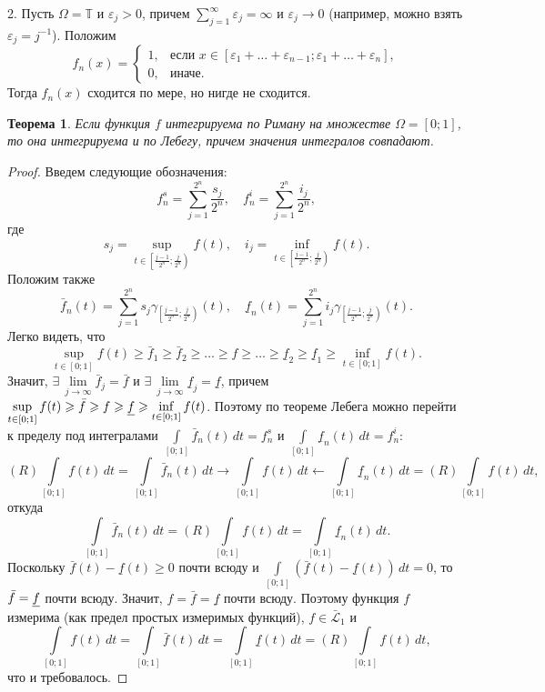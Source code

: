 \documentclass[12pt,titlepage]{article}
\newcounter{tema}
\newtheorem{theorem}{Теорема}[tema]
\theoremstyle{definition}
\newcommand*{\p}[1]{#1\nobreak\discretionary{}{\hbox{$\mathsurround=0pt #1$}}{}}
\begin{document}
2. Пусть $\Omega=\mathbb{T}$ и $\varepsilon_j>0$, причем
$\sum\limits_{j=1}^\infty \varepsilon_j=\infty$ и $\varepsilon_j\to
0$ (например, можно взять $\varepsilon_j=j^{-1}$). Положим
$$f_n(x)=\begin{cases}1,& \text{если $x\in[\varepsilon_1+\ldots+\varepsilon_
{n-1};\varepsilon_1+\ldots+\varepsilon_n]$},\\
0,&\text{иначе}.\end{cases}$$ Тогда $f_n(x)$ сходится по мере, но
нигде не сходится.

\vspace{5pt}

\begin{theorem}
Если функция $f$ интегрируема по Риману на множестве $\Omega=[0;1]$,
то она интегрируема и по Лебегу, причем значения интегралов
совпадают.
\end{theorem}

\begin{proof}
Введем следующие обозначения:
$$f_n^s=\sum\limits_{j=1}^{2^n}\frac{s_j}{2^n}, \quad
f_n^i=\sum\limits_{j=1}^{2^n}\frac{i_j}{2^n},$$ где
$$s_j=\sup\limits_{t\in\left[\frac{j-1}{2^n};\frac{j}{2^n}\right)}f(t), \quad
i_j=\inf\limits_{t\in\left[\frac{j-1}{2^n};\frac{j}{2^n}\right)}f(t).$$
Положим также
$$\bar{f}_n(t)=\sum\limits_{j=1}^{2^n}s_j\gamma_{\left[\frac{j-1}{2^n};
\frac{j}{2^n}\right)}(t), \quad
\underline{f}_n(t)=\sum\limits_{j=1}^{2^n}i_j\gamma_{\left[\frac{j-1}{2^n};
\frac{j}{2^n}\right)}(t).$$ Легко видеть, что
$$\sup\limits_{t\in[0;1]} f(t)\geqslant
\bar{f}_1\geqslant\bar{f}_2\geqslant\ldots\geqslant
f\geqslant\ldots\geqslant\underline{f}_2\geqslant\underline{f}_1\geqslant\inf
\limits_{t\in[0;1]}f(t).$$ Значит,
$\exists\,\lim\limits_{j\to\infty} \bar{f}_j=\bar{f}$ и
$\exists\,\lim\limits_{j\to\infty} \underline{f}_j=\underline{f}$,
причем $\sup\limits_{t\in[0;1]}f(t)\geqslant \bar{f}\geqslant
f\geqslant\underline{f}\p\geqslant \inf\limits_{t\in[0;1]}f(t)$.
Поэтому по теореме Лебега можно перейти к пределу под интегралами
$\int\limits_{[0;1]}\!\bar{f}_n(t)\,dt=f_n^s$ и
$\int\limits_{[0;1]}\!\underline{f}_n(t)\,dt=f_n^i$:
$$(R)\int\limits_{[0;1]}\!f(t)\,dt=\int\limits_{[0;1]}\!\bar{f}_n(t)\,dt\to
\int\limits_{[0;1]}\!f(t)\,dt\leftarrow\int\limits_{[0;1]}\!\underline{f}_n(t)\,dt
=(R)\int\limits_{[0;1]}\!f(t)\,dt,$$ откуда
$$\int\limits_{[0;1]}\!\bar{f}_n(t)\,dt=(R)\int\limits_{[0;1]}\!f(t)\,dt=
\int\limits_{[0;1]}\!\underline{f}_n(t)\,dt.$$ Поскольку
$\bar{f}(t)-\underline{f}(t)\geqslant 0$ почти всюду и
$\int\limits_{[0;1]}\!(\bar{f}(t)-\underline{f}(t))\,dt=0$, то
$\bar{f}\p=\underline{f}$ почти всюду. Значит,
$f=\bar{f}=\underline{f}$ почти всюду. Поэтому функция $f$ измерима
(как предел простых измеримых функций), $f\in\mathcal{\bar{L}}_1$ и
$$\int\limits_{[0;1]}\!f(t)\,dt=\int\limits_{[0;1]}\!\bar{f}(t)\,dt=
\int\limits_{[0;1]}\!\underline{f}(t)\,dt=(R)\int\limits_{[0;1]}\!f(t)\,dt,$$
что и требовалось.
\end{proof}
\end{document}
